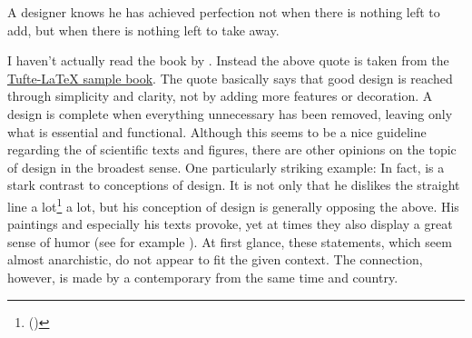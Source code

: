 \epigraph{A designer knows he has achieved perfection not when there is nothing left to add, but when there is nothing left to take away.}{}

I haven’t actually read the book  by . Instead the above quote is taken from the \href{https://tug.ctan.org/macros/latex/contrib/tufte-latex/sample-book.pdf}{Tufte-LaTeX sample book}. The quote basically says that good design is reached through simplicity and clarity, not by adding more features or decoration. A design is complete when everything unnecessary has been removed, leaving only what is essential and functional. Although this seems to be a nice guideline regarding the  of scientific texts and figures, there are other opinions on the topic of design in the broadest sense. One particularly striking example:
In fact,  is a stark contrast to  conceptions of design. It is not only that he dislikes the straight line a lot\footnote{\Cf {} (\cite{hundertwasserweb1})} a lot, but his conception of design is generally opposing the above. His paintings and especially his texts provoke, yet at times they also display a great sense of humor (see for example \cite{hundertwasserweb3}). At first glance, these statements, which seem almost anarchistic, do not appear to fit the given context. The connection, however, is made by a contemporary from the same time and country.